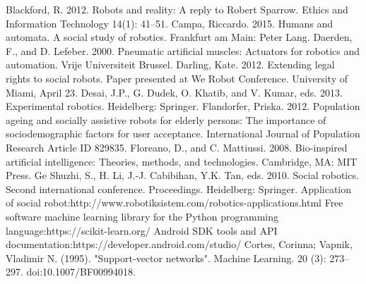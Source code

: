 \documentclass{fisatproject}
\begin{document}
\begin{thebibliography}{1}
\vspace{1cm}
Blackford, R. 2012. Robots and reality: A reply to Robert Sparrow. Ethics and Information Technology 14(1): 41–51.
Campa, Riccardo. 2015. Humans and automata. A social study of robotics. Frankfurt am Main: Peter Lang.
Daerden, F., and D. Lefeber. 2000. Pneumatic artificial muscles: Actuators for robotics and automation. Vrije Universiteit Brussel.
Darling, Kate. 2012. Extending legal rights to social robots. Paper presented at We Robot Conference. University of Miami, April 23.
Desai, J.P., G. Dudek, O. Khatib, and V. Kumar, eds. 2013. Experimental robotics. Heidelberg: Springer.
Flandorfer, Priska. 2012. Population ageing and socially assistive robots for elderly persons: The importance of sociodemographic factors for user acceptance. International Journal of Population Research Article ID 829835.
Floreano, D., and C. Mattiussi. 2008. Bio-inspired artificial intelligence: Theories, methods, and technologies. Cambridge, MA: MIT Press.
Ge Shuzhi, S., H. Li, J.-J. Cabibihan, Y.K. Tan, eds. 2010. Social robotics. Second international conference. Proceedings. Heidelberg: Springer.
Application of social robot:http://www.robotiksistem.com/robotics-applications.html
Free software machine learning library for the Python programming language:https://scikit-learn.org/
Android SDK tools and API documentation:https://developer.android.com/studio/
Cortes, Corinna; Vapnik, Vladimir N. (1995). "Support-vector networks". Machine Learning. 20 (3): 273–297. doi:10.1007/BF00994018.
\end{thebibliography}
\end{document}

